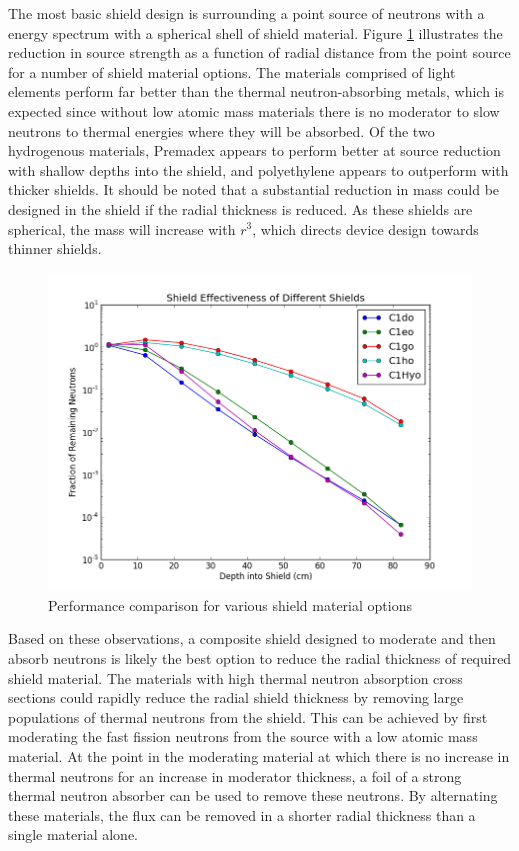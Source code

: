 \documentclass{mc2015}
\begin{document}
The most basic shield design is surrounding a point source of neutrons with a  energy spectrum with a spherical shell of shield material. Figure \ref{fig:basics} illustrates the reduction in source strength as a function of radial distance from the point source for a number of shield material options.%
The materials comprised of light elements perform far better than the thermal neutron-absorbing metals, which is expected since without low atomic mass materials there is no moderator to slow neutrons to thermal energies where they will be absorbed. Of the two hydrogenous materials, Premadex appears to perform better at source reduction with shallow depths into the shield, and polyethylene appears to outperform with thicker shields. It should be noted that a substantial reduction in mass could be designed in the shield if the radial thickness is reduced. As these shields are spherical, the mass will increase with $r^3$, which directs device design towards thinner shields.  


\begin{figure}
  \centering
  \includegraphics[width=4.5in]{Basics.png}
  \caption{Performance comparison for various shield material options}
  \label{fig:basics}
\end{figure}

Based on these observations, a composite shield designed to moderate and then absorb neutrons is likely the best option to reduce the radial thickness of required shield material. The materials with high thermal neutron absorption cross sections could rapidly reduce the radial shield thickness by removing large populations of thermal neutrons from the shield. This can be achieved by first moderating the fast fission neutrons from the  source with a low atomic mass material. At the point in the moderating material at which there is no increase in thermal neutrons for an increase in moderator thickness, a foil of a strong thermal neutron absorber can be used to remove these neutrons. By alternating these materials, the flux can be removed in a shorter radial thickness than a single material alone. 
\end{document}
